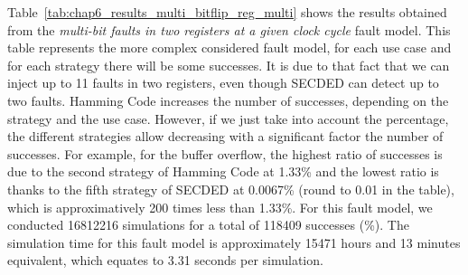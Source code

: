 Table~\ref{tab:chap6_results_multi_bitflip_reg_multi} shows the results obtained from the \textit{multi-bit faults in two registers at a given clock cycle} fault model. This table represents the more complex considered fault model, for each use case and for each strategy there will be some successes. It is due to that fact that we can inject up to 11 faults in two registers, even though SECDED can detect up to two faults. Hamming Code increases the number of successes, depending on the strategy and the use case. However, if we just take into account the percentage, the different strategies allow decreasing with a significant factor the number of successes. For example, for the buffer overflow, the highest ratio of successes is due to the second strategy of Hamming Code at 1.33\% and the lowest ratio is thanks to the fifth strategy of SECDED at 0.0067\% (round to 0.01 in the table), which is approximatively 200 times less than 1.33\%. For this fault model, we conducted \num{16812216} simulations for a total of \num{118409} successes (\%). The simulation time for this fault model is approximately \num{15471} hours and 13 minutes equivalent, which equates to 3.31 seconds per simulation.

